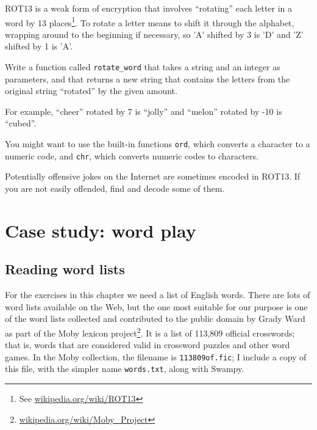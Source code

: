 \documentclass[10pt]{book}
\begin{document}
\begin{ex}

\label{exrotate}
ROT13 is a weak form of encryption that involves ``rotating'' each
letter in a word by 13 places\footnote{See
  \url{wikipedia.org/wiki/ROT13}}.  To rotate a letter means
to shift it through the alphabet, wrapping around to the beginning if
necessary, so 'A' shifted by 3 is 'D' and 'Z' shifted by 1 is 'A'.

Write a function called \verb"rotate_word"
that takes a string and an integer as parameters, and that returns
a new string that contains the letters from the original string
``rotated'' by the given amount.  

For example, ``cheer'' rotated by 7 is ``jolly'' and ``melon'' rotated
by -10 is ``cubed''.  


You might want to use the built-in functions {\tt ord}, which converts
a character to a numeric code, and {\tt chr}, which converts numeric
codes to characters.

Potentially offensive jokes on the Internet are sometimes encoded
in ROT13.  If you are not easily offended, find and decode some
of them.
\end{ex}


\chapter{Case study: word play}

\section{Reading word lists}
\label{wordlist}

For the exercises in this chapter we need a list of English words.
There are lots of word lists available on the Web, but the one most
suitable for our purpose is one of the word lists collected and
contributed to the public domain by Grady Ward as part of the Moby
lexicon project\footnote{\url{wikipedia.org/wiki/Moby_Project}}.  It
is a list of 113,809 official crosswords; that is, words that are
considered valid in crossword puzzles and other word games.  In the
Moby collection, the filename is {\tt 113809of.fic}; I include a copy
of this file, with the simpler name {\tt words.txt}, along with
Swampy.

\end{document}
